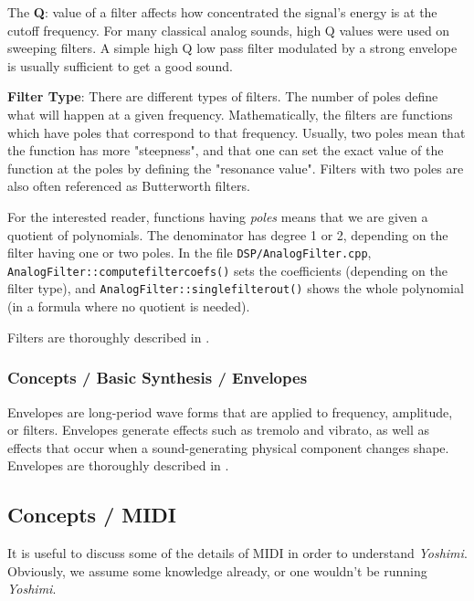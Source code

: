    The \textbf{Q}:
   value of a filter affects how concentrated the signal’s energy is at
   the cutoff frequency.
   For many classical analog sounds, high Q values were used on sweeping
   filters. A simple high Q low pass filter modulated by a strong envelope is
   usually sufficient to get a good sound.

   \textbf{Filter Type}:
   There are different types of filters. The number of poles define what will
   happen at a given frequency. Mathematically, the filters are functions
   which have poles that correspond to that frequency. Usually, two poles
   mean that the function has more "steepness", and that one can set the
   exact value of the function at the poles by defining the "resonance
   value". Filters with two poles are also often referenced as Butterworth
   filters.

   For the interested reader, functions having \textsl{poles}
   means that we are given a quotient of polynomials. The denominator has
   degree 1 or 2, depending on the filter having one or two poles. In the
   file \texttt{DSP/AnalogFilter.cpp},
   \texttt{AnalogFilter::computefiltercoefs()} sets the coefficients
   (depending on the filter type), and
   \texttt{AnalogFilter::singlefilterout()} shows the whole polynomial (in a
   formula where no quotient is needed).

   Filters are thoroughly described in
   .

\subsubsection{Concepts / Basic Synthesis / Envelopes}
\label{subsubsec:concepts_basics_envelopes}

   Envelopes are long-period wave forms that are applied to frequency,
   amplitude, or filters.  Envelopes generate effects such as tremolo and
   vibrato, as well as effects that occur when a sound-generating physical
   component changes shape.
   Envelopes are thoroughly described in
   .

\subsection{Concepts / MIDI}
\label{subsec:concepts_midi}

   It is useful to discuss some of the details of MIDI in order
   to understand \textsl{Yoshimi}.  Obviously, we assume
   some knowledge already, or one wouldn't be running
   \textsl{Yoshimi}.

